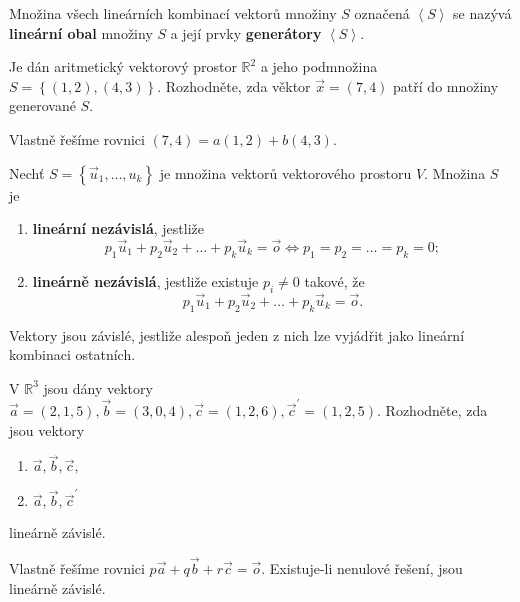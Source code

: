 \begin{definition}
    Množina všech lineárních kombinací vektorů množiny $S$ označená $\left < S \right >$ se nazývá \textbf{lineární
    obal} množiny $S$ a její prvky \textbf{generátory} $\left < S \right >$.
\end{definition}

\begin{priklad}
Je dán aritmetický vektorový prostor $\mathbb R^{2}$ a jeho podmnožina $S=\left \{ (1,2), (4,3) \right \}. $
Rozhodněte, zda věktor $\vec x = (7,4)$ patří do množiny generované $S$.
\end{priklad}

\begin{reseni}
Vlastně řešíme rovnici $(7,4)=a(1,2)+b(4,3).$
\end{reseni}

\begin{definition}
    Nechť $S= \left \{ \vec u_1, \dots, u_k \right \} $ je množina vektorů vektorového prostoru $V$. Množina $S$ je
   	\begin{enumerate}[$i.$]
    \item \textbf{lineární nezávislá}, jestliže
    $$p_1\vec u_1 + p_2\vec u_2 + \dots + p_k\vec u_k = \vec o \iff p_1 = p_2 = \dots = p_k = 0;$$
   	\item \textbf{lineárně nezávislá}, jestliže existuje $p_i\ne 0$ takové, že
    $$ p_1\vec u_1 + p_2\vec u_2 + \dots + p_k\vec u_k = \vec o.$$
    \end{enumerate}
\end{definition}

\begin{veta}
    Vektory jsou závislé, jestliže alespoň jeden z nich lze vyjádřit jako lineární
    kombinaci ostatních.
\end{veta}

\begin{priklad}
V $\mathbb R^3$ jsou dány vektory $\vec a = (2,1,5), \vec b = (3,0,4), \vec c=(1,2,6),
\vec c^\prime = (1,2,5).$ Rozhodněte, zda jsou vektory
\begin{enumerate}[$a.$]
\item $\vec a, \vec b,\vec c,$
\item $\vec a, \vec b,\vec c^\prime$
\end{enumerate}
lineárně závislé.
\end{priklad}

\begin{reseni}
Vlastně řešíme rovnici $p\vec a + q\vec b + r\vec c= \vec o.$ Existuje-li nenulové
řešení, jsou lineárně závislé.
\end{reseni}

